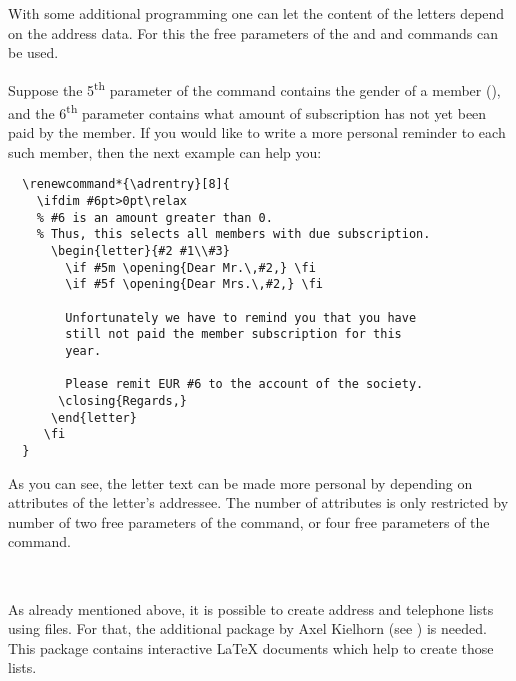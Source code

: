 With some additional programming one can let the content of the
letters depend on the address data. For this the free parameters of
the  and and  commands can be used.

\begin{Example}
  Suppose the 5\textsuperscript{th} parameter of the 
  command contains the gender of a member (), and the
  6\textsuperscript{th} parameter contains what amount of subscription
  has not yet been paid by the member. If you would like to write a
  more personal reminder to each such member, then the next example
  can help you:
\begin{lstlisting}
  \renewcommand*{\adrentry}[8]{
    \ifdim #6pt>0pt\relax
    % #6 is an amount greater than 0.
    % Thus, this selects all members with due subscription.
      \begin{letter}{#2 #1\\#3}
        \if #5m \opening{Dear Mr.\,#2,} \fi
        \if #5f \opening{Dear Mrs.\,#2,} \fi

        Unfortunately we have to remind you that you have
        still not paid the member subscription for this
        year.

        Please remit EUR #6 to the account of the society.
       \closing{Regards,}
      \end{letter}
     \fi
  }
\end{lstlisting}
\end{Example}
As you can see, the letter text can be made more personal by depending
on attributes of the letter's addressee.  The number of attributes is
only restricted by number of two free parameters of the
 command, or four free parameters of the
 command.

\begin{Declaration}
  \\
\end{Declaration}
%
As already mentioned above, it is possible to create address and
telephone lists using  files.  For that, the additional
package  by Axel Kielhorn (see
\cite{package:adrconv}) is needed.  This package contains interactive
{\LaTeX} documents which help to create those lists.

